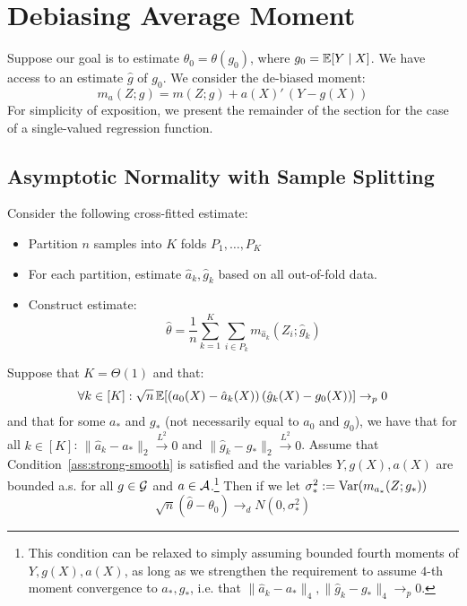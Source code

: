 
\section{Debiasing Average Moment}\label{sec:debiasing}

Suppose our goal is to estimate $\theta_0 = \theta(g_0)$, where $g_0=\mathbb{E}[Y\mid X]$. We have access to an estimate $\hat{g}$ of $g_0$. We consider the de-biased moment:
\begin{equation}
    m_{a}(Z; g) = m(Z; g) + a(X)'\, (Y - g(X))
\end{equation}
For simplicity of exposition, we present the remainder of the section for the case of a single-valued regression function.

\subsection{Asymptotic Normality with Sample Splitting}

Consider the following cross-fitted estimate:
\begin{itemize}
    \item Partition $n$ samples into $K$ folds $P_1, \ldots, P_K$
    \item For each partition, estimate $\hat{a}_k, \hat{g}_k$ based on all out-of-fold data.
    \item Construct estimate:
    \begin{equation}
        \hat{\theta} = \frac{1}{n} \sum_{k=1}^K \sum_{i\in P_k} m_{\hat{a}_k}(Z_i; \hat{g}_k)
    \end{equation}
\end{itemize}

\begin{lemma}\label{lem:debias}
Suppose that $K=\Theta(1)$ and that:
\begin{align}\label{eqn:main-cond}
    \forall k \in [K]: \sqrt{n}\, \mathbb{E}[(a_0(X) - \hat{a}_k(X))\, (\hat{g}_k(X) - g_0(X))] \rightarrow_p 0
\end{align}
and that for some $a_*$ and $g_*$ (not necessarily equal to $a_0$ and $g_0$), we have that for all $k\in [K]$: $\|\hat{a}_k-a_*\|_2 \stackrel{L^2}{\to} 0$ and $\|\hat{g}_k-g_*\|_2\stackrel{L^2}{\to} 0$. Assume that Condition~\ref{ass:strong-smooth} is satisfied and the variables $Y, g(X), a(X)$ are bounded a.s. for all $g\in {\mathcal G}$ and $a\in {\mathcal A}$.\footnote{This condition can be relaxed to simply assuming bounded fourth moments of $Y, g(X), a(X)$, as long as we strengthen the requirement to assume $4$-th moment convergence to $a_*, g_*$, i.e. that $\|\hat{a}_k-a_*\|_4, \|\hat{g}_k-g_*\|_4 \to_p 0$.} Then if we let $\sigma_*^2 := \text{Var}(m_{a_*}(Z; g_*))$
\begin{equation}
    \sqrt{n}\left(\hat{\theta} - \theta_0\right) \to_d N\left(0, \sigma_*^2\right)
\end{equation}
\end{lemma}

